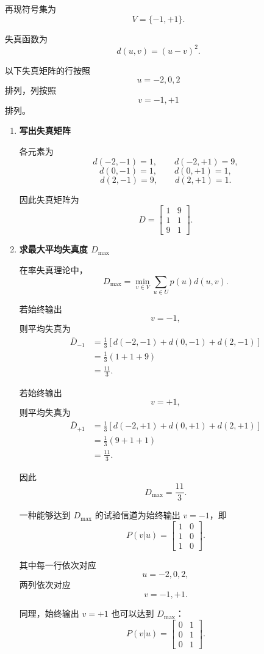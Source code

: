 \documentclass[UTF8,a4paper,12pt]{ctexart}
\begin{document}
再现符号集为
\[
V=\{-1,+1\}.
\]

失真函数为
\[
d(u,v)=(u-v)^2.
\]

以下失真矩阵的行按照
\[
u=-2,0,2
\]
排列，列按照
\[
v=-1,+1
\]
排列。

\begin{enumerate}[label=\arabic*., leftmargin=2.2em]

\item \textbf{写出失真矩阵}

各元素为
\[
d(-2,-1)=1,
\qquad
d(-2,+1)=9,
\]
\[
d(0,-1)=1,
\qquad
d(0,+1)=1,
\]
\[
d(2,-1)=9,
\qquad
d(2,+1)=1.
\]

因此失真矩阵为
\[
\boxed{
D=
\begin{bmatrix}
1&9\\
1&1\\
9&1
\end{bmatrix}
}.
\]


\item \textbf{求最大平均失真度 $D_{\max}$}

在率失真理论中，
\[
D_{\max}
=
\min_{v\in V}
\sum_{u\in U}p(u)d(u,v).
\]

若始终输出
\[
v=-1,
\]
则平均失真为
\[
\begin{aligned}
\overline D_{-1}
&=
\frac13
\left[
d(-2,-1)+d(0,-1)+d(2,-1)
\right]\\
&=
\frac13(1+1+9)\\
&=
\frac{11}{3}.
\end{aligned}
\]

若始终输出
\[
v=+1,
\]
则平均失真为
\[
\begin{aligned}
\overline D_{+1}
&=
\frac13
\left[
d(-2,+1)+d(0,+1)+d(2,+1)
\right]\\
&=
\frac13(9+1+1)\\
&=
\frac{11}{3}.
\end{aligned}
\]

因此
\[
\boxed{
D_{\max}=\frac{11}{3}
}.
\]

一种能够达到 $D_{\max}$ 的试验信道为始终输出 $v=-1$，即
\[
\boxed{
P(v|u)
=
\begin{bmatrix}
1&0\\
1&0\\
1&0
\end{bmatrix}
}.
\]

其中每一行依次对应
\[
u=-2,0,2,
\]
两列依次对应
\[
v=-1,+1.
\]

同理，始终输出 $v=+1$ 也可以达到 $D_{\max}$：
\[
P(v|u)
=
\begin{bmatrix}
0&1\\
0&1\\
0&1
\end{bmatrix}.
\]


\end{enumerate}
\end{document}
